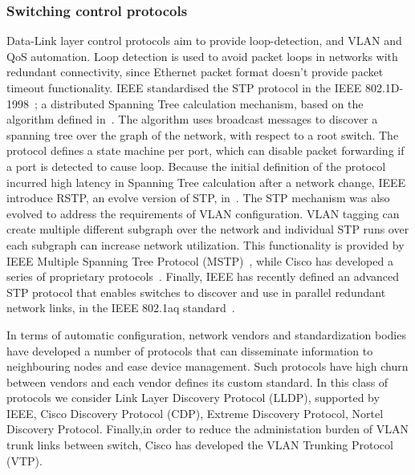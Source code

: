 \subsubsection{Switching control protocols}

Data-Link layer control protocols aim to provide loop-detection, and VLAN and
QoS automation. Loop detection is used to avoid packet loops in networks with
redundant connectivity, since Ethernet packet format doesn't provide packet
timeout functionality. IEEE standardised the STP protocol in the IEEE
802.1D-1998~\cite{ieee_802_1d}; a distributed Spanning Tree calculation
mechanism, based on the algorithm defined in~\cite{Perlman1985}. The algorithm
uses broadcast messages to discover a spanning tree over the graph of the
network, with respect to a root switch. The protocol defines a state machine per
port, which can disable packet forwarding if a port is detected to cause loop.
Because the initial definition of the protocol incurred high latency in Spanning
Tree calculation after a network change, IEEE introduce RSTP, an evolve version
of STP, in~\cite{ieee_802_1d_2004}.  The STP mechanism was also evolved to
address the requirements of VLAN configuration. VLAN tagging can create multiple
different subgraph over the network and individual STP runs over each subgraph
can increase network utilization. This functionality is provided by IEEE
Multiple Spanning Tree Protocol (MSTP)~\cite{ieee_802_1q}, while Cisco has
developed a series of proprietary protocols~\cite{pvst,pvst+}.  Finally, IEEE
has recently defined an advanced STP protocol that enables switches to discover
and use in parallel redundant network links, in the IEEE 802.1aq
standard~\cite{ieee_802_1aq}.

In terms of automatic configuration, network vendors and standardization bodies
have developed a number of protocols that can disseminate information to
neighbouring nodes and ease device management. Such protocols have high
churn between vendors and each vendor defines its custom standard. In this
class of protocols we consider Link Layer Discovery Protocol (LLDP), supported
by IEEE, Cisco Discovery Protocol (CDP),  Extreme Discovery Protocol, Nortel
Discovery Protocol. Finally,in order to reduce the administation
burden of VLAN trunk links between switch, Cisco has developed the VLAN Trunking Protocol
(VTP).

